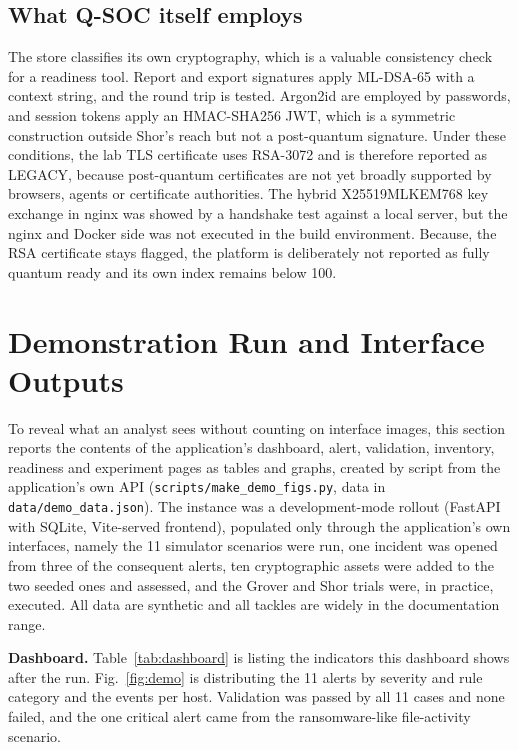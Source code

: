 \documentclass[conference]{IEEEtran}
\newcommand{\code}[1]{\texttt{#1}}
\begin{document}
\subsection{What Q-SOC itself employs}
The store classifies its own cryptography, which is a valuable consistency check for a readiness tool. Report and export signatures apply ML-DSA-65 with a context string, and the round trip is tested. Argon2id are employed by passwords, and session tokens apply an HMAC-SHA256 JWT, which is a symmetric construction outside Shor's reach but not a post-quantum signature. Under these conditions, the lab TLS certificate uses RSA-3072 and is therefore reported as LEGACY, because post-quantum certificates are not yet broadly supported by browsers, agents or certificate authorities. The hybrid X25519MLKEM768 key exchange in nginx was showed by a handshake test against a local server, but the nginx and Docker side was not executed in the build environment. Because, the RSA certificate stays flagged, the platform is deliberately not reported as fully quantum ready and its own index remains below 100.

\section{Demonstration Run and Interface Outputs}\label{sec:demo}
To reveal what an analyst sees without counting on interface images, this section reports the contents of the application's dashboard, alert, validation, inventory, readiness and experiment pages as tables and graphs, created by script from the application's own API (\code{scripts/make\_demo\_figs.py}, data in \code{data/demo\_data.json}). The instance was a development-mode rollout (FastAPI with SQLite, Vite-served frontend), populated only through the application's own interfaces, namely the 11 simulator scenarios were run, one incident was opened from three of the consequent alerts, ten cryptographic assets were added to the two seeded ones and assessed, and the Grover and Shor trials were, in practice, executed. All data are synthetic and all tackles are widely in the documentation range.

\textbf{Dashboard.} Table~\ref{tab:dashboard} is listing the indicators this dashboard shows after the run. Fig.~\ref{fig:demo} is distributing the 11 alerts by severity and rule category and the events per host. Validation was passed by all 11 cases and none failed, and the one critical alert came from the ransomware-like file-activity scenario.
\end{document}

